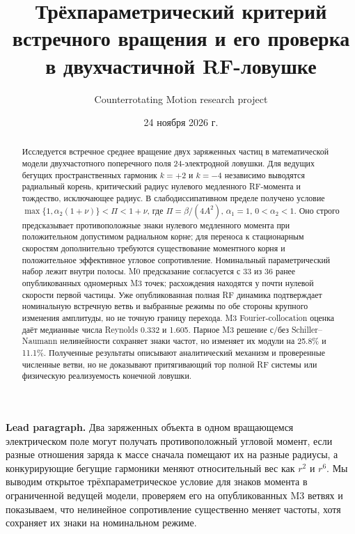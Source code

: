 \documentclass[aip,cha,reprint,amsmath,amssymb]{revtex4-2}
\begin{document}
\title{Трёхпараметрический критерий встречного вращения и его проверка в двухчастичной RF-ловушке}
\author{Counterrotating Motion research project}
\date{24 ноября 2026 г.}

\begin{abstract}
Исследуется встречное среднее вращение двух заряженных частиц в математической модели двухчастотного поперечного поля 24-электродной ловушки. Для ведущих бегущих пространственных гармоник $k=+2$ и $k=-4$ независимо выводятся радиальный корень, критический радиус нулевого медленного RF-момента и тождество, исключающее радиус. В слабодиссипативном пределе получено условие $\max\{1,\alpha_2(1+\nu)\}<\Pi<1+\nu$, где $\Pi=\beta/(4A^2)$, $\alpha_1=1$, $0<\alpha_2<1$. Оно строго предсказывает противоположные знаки нулевого медленного момента при положительном допустимом радиальном корне; для переноса к стационарным скоростям дополнительно требуются существование моментного корня и положительное эффективное угловое сопротивление. Номинальный параметрический набор лежит внутри полосы. M0 предсказание согласуется с 33 из 36 ранее опубликованных одномерных M3 точек; расхождения находятся у почти нулевой скорости первой частицы. Уже опубликованная полная RF динамика подтверждает номинальную встречную ветвь и выбранные режимы по обе стороны крупного изменения амплитуды, но не точную границу перехода. M3 Fourier-collocation оценка даёт медианные числа Reynolds 0.332 и 1.605. Парное M3 решение с/без Schiller--Naumann нелинейности сохраняет знаки частот, но изменяет их модули на 25.8\% и 11.1\%. Полученные результаты описывают аналитический механизм и проверенные численные ветви, но не доказывают притягивающий тор полной RF системы или физическую реализуемость конечной ловушки.
\end{abstract}

\maketitle

\noindent\textbf{Lead paragraph.} Два заряженных объекта в одном вращающемся электрическом поле могут получать противоположный угловой момент, если разные отношения заряда к массе сначала помещают их на разные радиусы, а конкурирующие бегущие гармоники меняют относительный вес как $r^2$ и $r^6$. Мы выводим открытое трёхпараметрическое условие для знаков момента в ограниченной ведущей модели, проверяем его на опубликованных M3 ветвях и показываем, что нелинейное сопротивление существенно меняет частоты, хотя сохраняет их знаки на номинальном режиме.
\end{document}
